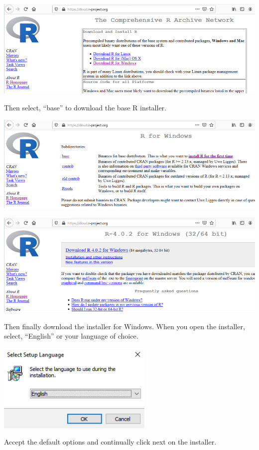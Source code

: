 \documentclass[
]{book}
\begin{document}
\includegraphics{images/05-r_1.png}

Then select, ``base'' to download the base R installer.

\includegraphics{images/05-r_2.png}

\includegraphics{images/05-r_3.png}

Then finally download the installer for Windows. When you open the installer, select, ``English'' or your language of choice.

\includegraphics{images/05-r_4.png}

Accept the default options and continually click next on the installer.
\end{document}
